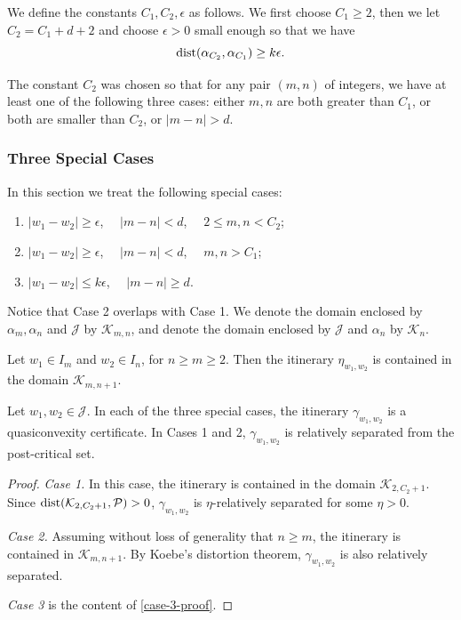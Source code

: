 We define the constants $C_1, C_2, \epsilon$ as follows. We first choose $C_1 \ge 2$, then we let $C_2 = C_1 + d+2$ and choose $\epsilon >0$ small enough so that we have 
\begin{equation}
	\operatorname{dist}(\alpha_{C_2}, \alpha_{C_1}) \geq k \epsilon.
\end{equation}

The constant $C_2$ was chosen so that for any pair $(m,n)$ of integers, we have at least one of the following three cases: either $m,n$ are both greater than $C_1$, or both are smaller than $C_2$, or $|m-n| > d$.

\subsubsection{Three Special Cases}
In this section we treat the following special cases:
\begin{enumerate}
	\item $|w_1-w_2| \geq  \epsilon$, $\quad |m-n|<d$, $\quad 2 \le m,n < C_2$; %
	\item $|w_1-w_2| \geq \epsilon$, $\quad |m-n|<d$, $\quad  m,n> C_1$; %
	\item $|w_1-w_2| \leq k \epsilon$, $\quad |m-n| \geq d$.
\end{enumerate}

Notice that Case 2 overlaps with Case 1.
 We denote the domain enclosed by $\alpha_m, \alpha_n$ and $\mathcal J$ by $\mathcal K_{m,n}$, and denote the domain enclosed by $\mathcal J$ and $\alpha_n$ by $\mathcal K_n$.

\begin{lemma}
Let $w_1 \in I_m$ and $w_2 \in I_n$, for $n \geq m \geq 2$. Then the itinerary $\eta_{w_1,w_2}$ is contained in the domain $\mathcal K_{m,n+1}$.
\end{lemma}

\begin{lemma}
\label{case 1 rel. sep}
Let $w_1,w_2 \in \mathcal J$. In each of the three special cases, the itinerary $\gamma _{w_1,w_2}$ is a quasiconvexity certificate. In Cases 1 and 2, $\gamma _{w_1,w_2}$ is relatively separated from the post-critical set.
\end{lemma}

\begin{proof}
\emph{Case 1.} In this case, the itinerary is contained in the domain $\mathcal K_{2, C_2+1}$.
Since $\operatorname{dist}(\mathcal K_{2, C_2+1}, \mathcal P)>0$, $\gamma _{w_1,w_2}$ is $\eta$-relatively separated for some $\eta>0$. 

\emph{Case 2.}
Assuming without loss of generality that $n \geq m$, the itinerary is contained in $\mathcal K_{m,n+1}$. By Koebe's distortion theorem, $\gamma _{w_1,w_2}$ is also relatively separated.

\emph{Case 3} is the content of \cref{case-3-proof}.
\end{proof}

